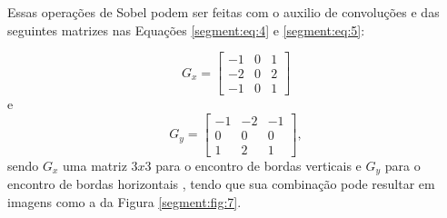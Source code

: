 Essas operações de Sobel podem ser feitas com o auxilio de convoluções e das seguintes matrizes nas Equações \ref{segment:eq:4} e \ref{segment:eq:5}:

\begin{equation}
\label{segment:eq:4}
    G_x = \begin{bmatrix}
    -1 & 0 & 1 \\ 
    -2 & 0 & 2 \\ 
    -1 & 0 & 1
    \end{bmatrix}
\end{equation}
e
\begin{equation}
\label{segment:eq:5}
    G_y = \begin{bmatrix}
    -1 & -2 & -1 \\ 
     0 & 0 & 0 \\ 
     1 & 2 & 1
    \end{bmatrix},
\end{equation}
sendo $G_x$ uma matriz $3x3$ para o encontro de bordas verticais e $G_y$ para o encontro de bordas horizontais \cite{pedrini2008analise}, tendo que sua combinação pode resultar em imagens como a da Figura \ref{segment:fig:7}.


